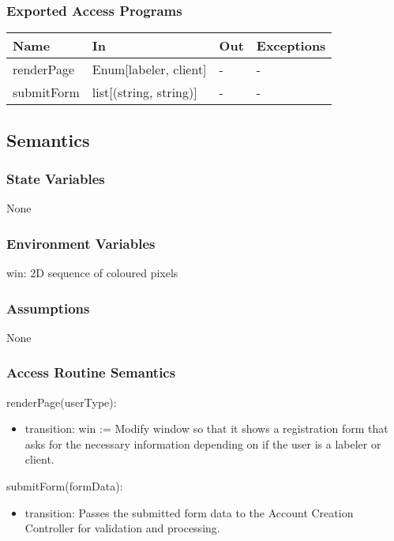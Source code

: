 \documentclass[12pt, titlepage]{article}
\begin{document}
\subsubsection{Exported Access Programs}

\begin{center}
\begin{tabular}{p{2cm} p{4cm} p{4cm} p{2cm}}
\hline
\textbf{Name} & \textbf{In} & \textbf{Out} & \textbf{Exceptions} \\
\hline
renderPage & Enum[labeler, client] & - & - \\
submitForm & list[(string, string)] & - & - \\
\hline
\end{tabular}
\end{center}

\subsection{Semantics}

\subsubsection{State Variables}
None
\subsubsection{Environment Variables}
win: 2D sequence of coloured pixels

\subsubsection{Assumptions}
None

\subsubsection{Access Routine Semantics}

\noindent renderPage(userType):
\begin{itemize}
\item transition: win := Modify window so that it shows a registration form that asks for the necessary information depending on if the user is a labeler or client.
\end{itemize}

\noindent submitForm(formData):
\begin{itemize}
\item transition: Passes the submitted form data to the Account Creation Controller for validation and processing.
\end{itemize}
\end{document}
